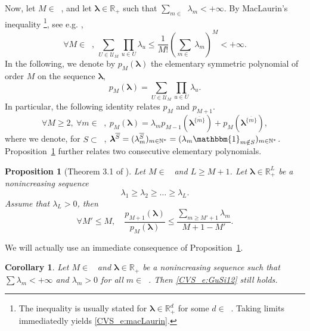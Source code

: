 \documentclass[twoside,11pt]{book}
\newtheorem{corollary}{Corollary}
\newtheorem{proposition}{Proposition}
\numberwithin{theorem}{chapter}
\numberwithin{definition}{chapter}
\numberwithin{proposition}{chapter}
\numberwithin{corollary}{chapter}
\numberwithin{example}{chapter}
\numberwithin{lemma}{chapter}
\numberwithin{assumption}{chapter}
\numberwithin{equation}{chapter}
\numberwithin{figure}{chapter}
\DeclareMathOperator{\Ns}{\mathbb{N}^{*}}
\def\ind{\mathbbm{1}}
\newcommand{\rb}[1]{\textcolor{magenta}{#1}}
\begin{document}
Now, let $M \in \Ns$, and let $\bm{\lambda} \in \mathbb{R}^{\Ns}_{+}$ such that $\sum_{m \in \Ns} \lambda_{m} < +\infty$. By MacLaurin’s inequality \footnote{The inequality is usually stated for $\bm{\lambda} \in \mathbb{R}^{d}_{+}$ for some $d \in \Ns$. Taking limits immediatedly yields \eqref{CVS_e:macLaurin}.}, see e.g. \citep[Chapter 12]{Ste04},
\begin{equation}
  \label{CVS_e:macLaurin}
\forall M \in \Ns, \: \sum\limits_{U \in \mathcal{U}_{M}} \prod\limits_{u \in U} \lambda_{u} \leq \frac{1}{M!}\left(\sum\limits_{m \in \Ns} \lambda_{m}\right)^{M} < +\infty.
\end{equation}
In the following, we denote by $p_{M}(\bm{\lambda})$ the elementary symmetric polynomial of order $M$ on the sequence $\bm{\lambda}$,
\begin{equation}
p_{M}(\bm{\lambda}) = \sum\limits_{U \in \mathcal{U}_{M}} \prod\limits_{u \in U} \lambda_{u}.
\end{equation}
In particular, the following identity relates $p_M$ and $p_{M+1}$.
\begin{equation}
\forall M \geq 2, \: \forall m \in \Ns, \: p_{M}(\bm{\lambda}) = \lambda_{m} p_{M-1}(\bm{\lambda}^{\overline{\{m\}}}) + p_{M}(\bm{\lambda}^{\overline{\{m\}}}),
\end{equation}
where we denote, for $S \subset \Ns$, $\bm{\lambda}^{\overline{S}} = (\lambda^{\overline{S}}_{m})_{m \in \Ns} = (\lambda_m \ind_{m\notin S})_{m \in \Ns}$. Proposition~\ref{CVS_thm:schur_convex_volume_sampling} further relates two consecutive elementary polynomials.

\begin{proposition}[Theorem 3.1 of \citealp{GuSi12}]\label{CVS_thm:schur_convex_volume_sampling}
Let $M \in \Ns$ and $L \geq M+1$. Let $\bm{\lambda} \in \mathbb{R}_{+}^{L}$ be a nonincreasing sequence
\begin{equation}
\lambda_{1} \geq \lambda_{2} \geq \dots \geq \lambda_{L}.
\end{equation}
Assume that $\lambda_{L} >0$, then
\begin{equation}
  \label{CVS_e:GuSi12}
 \forall M' \leq M, \quad \frac{p_{M+1}(\bm{\lambda})}{p_{M}(\bm{\lambda})} \leq \frac{\sum_{m \geq M'+1} \lambda_{m}}{M+1-M'}.
\end{equation}
\end{proposition}

We will actually use an immediate consequence of Proposition~\ref{CVS_thm:schur_convex_volume_sampling}.
\begin{corollary}\label{CVS_cor:schur_convex_volume_sampling}
Let $M \in \Ns$ and $\bm{\lambda} \in \mathbb{R}_{+}^{\Ns}$ be a nonincreasing sequence such that $\sum \lambda_{m} < +\infty$ and $\lambda_{m} >0$ for all $m \in \Ns$. Then \eqref{CVS_e:GuSi12} still holds.
\end{corollary}
\end{document}

